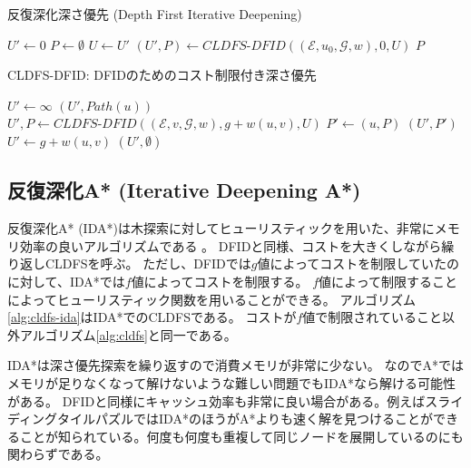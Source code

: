 \begin{algorithm}
\caption{反復深化深さ優先 (Depth First Iterative Deepening)}
\label{alg:depth-first-iterative-deepening}
        $U' \leftarrow 0$\;
        $P \leftarrow \emptyset$\;
         {
          $U \leftarrow U'$\;
          $(U', P) \leftarrow CLDFS\text{-}DFID((\mathcal{E}, u_0, \mathcal{G}, w), 0, U)$\;
        }
        \Return $P$\;
\end{algorithm}

\begin{algorithm}
\caption{CLDFS-DFID: DFIDのためのコスト制限付き深さ優先}
\label{alg:cldfs}
        $U' \leftarrow \infty$\;
	 {
		\Return $(U', Path(u))$\;
	}
	 {
		 {
			$U', P \leftarrow CLDFS\text{-}DFID((\mathcal{E}, v, \mathcal{G}, w), g + w(u, v), U)$\;
		   {
        $P' \leftarrow (u, P)$\;
		    \Return $(U', P')$\;
		  }
		}
     {
      $U' \leftarrow g + w(u, v)$\;
    }
	}
	\Return $(U', \emptyset)$\;
\end{algorithm}


\subsection{反復深化A* (Iterative Deepening A*)}
\label{sec:iterative-deepening-astar}


反復深化A* (IDA*)は木探索に対してヒューリスティックを用いた、非常にメモリ効率の良いアルゴリズムである \cite{korf:85a}。
DFIDと同様、コストを大きくしながら繰り返しCLDFSを呼ぶ。
ただし、DFIDでは$g$値によってコストを制限していたのに対して、IDA*では$f$値によってコストを制限する。
$f$値によって制限することによってヒューリスティック関数を用いることができる。
アルゴリズム\ref{alg:cldfs-ida}はIDA*でのCLDFSである。
コストが$f$値で制限されていること以外アルゴリズム\ref{alg:cldfs}と同一である。

IDA*は深さ優先探索を繰り返すので消費メモリが非常に少ない。
なのでA*ではメモリが足りなくなって解けないような難しい問題でもIDA*なら解ける可能性がある。
DFIDと同様にキャッシュ効率も非常に良い場合がある。例えばスライディングタイルパズルではIDA*のほうがA*よりも速く解を見つけることができることが知られている\cite{korf:85a}。何度も何度も重複して同じノードを展開しているのにも関わらずである。

